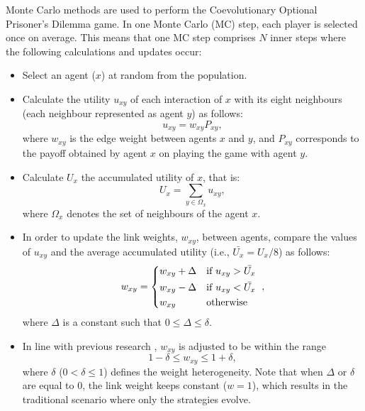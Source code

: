 \documentclass{llncs}
\begin{document}
Monte Carlo methods are used to perform the Coevolutionary Optional Prisoner's
Dilemma game. In one Monte Carlo (MC) step, each player is selected once on
average. This means that one MC step comprises $N$ inner steps where the
following calculations and updates occur:

\begin{itemize}
    \item Select an agent ($x$) at random from the population.

    \item Calculate the utility $u_{xy}$ of each interaction of $x$ with its
        eight neighbours (each neighbour represented as agent $y$) as follows:
        \begin{equation}
            u_{xy} = w_{xy} P_{xy},
        \end{equation}
        where $w_{xy}$ is the edge weight between agents $x$ and $y$, and
        $P_{xy}$ corresponds to the payoff obtained by agent $x$ on playing the
        game with agent $y$.

    \item Calculate $U_x$ the accumulated utility of $x$, that is:
        \begin{equation}
            U_x = \sum_{y \in \Omega_x}u_{xy},
        \end{equation}
        where $\Omega_x$ denotes the set of neighbours of the agent $x$.

    \item In order to update the link weights, $w_{xy}$, between agents, compare
        the values of $u_{xy}$ and the average accumulated utility
        (i.e., $\bar{U_x}=U_x/8$) as follows:
        \begin{equation}
            \label{eq:bigdelta}
            w_{xy} =
            \begin{dcases*}
                w_{xy} + \Delta  & if $u_{xy} > \bar{U_x}$ \\
                w_{xy} - \Delta  & if $u_{xy} < \bar{U_x}$ \\
                w_{xy}           & otherwise
            \end{dcases*},
        \end{equation}
        where $\Delta$ is a constant such that $0 \le \Delta \le \delta$.

    \item In line with previous research \cite{Huang2015,Wang2014}, $w_{xy}$
        is adjusted to be within the range
        \begin{equation}
            \label{eq:smalldelta}
            1-\delta \le w_{xy} \le 1+\delta,
        \end{equation}
        where $\delta$ ($0 < \delta \le 1$) defines the weight heterogeneity.
        Note that when $\Delta$ or $\delta$ are equal to $0$, the link weight
        keeps constant (${w=1}$), which results in the traditional scenario
        where only the strategies evolve.


\end{itemize}
\end{document}
